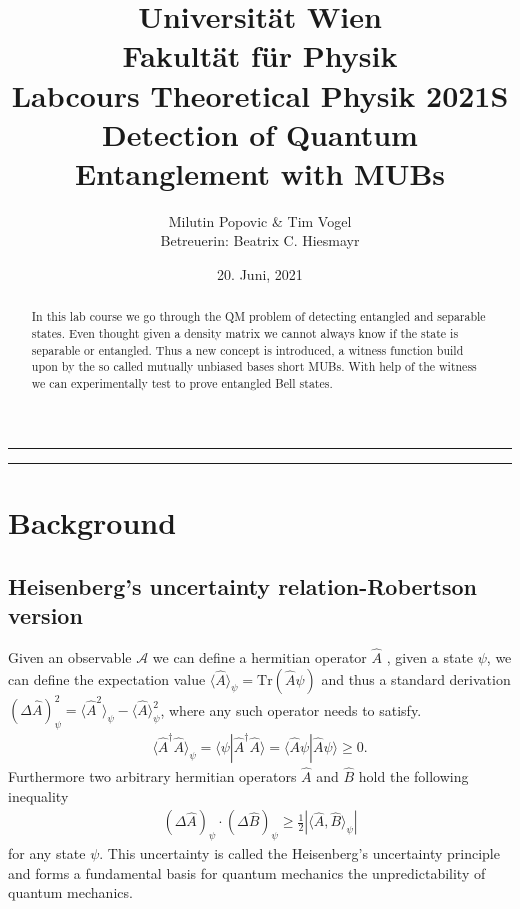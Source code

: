 \documentclass[a4paper]{article}
\title{Universität Wien\\ Fakultät für Physik\\
\vspace{1.25cm}Labcours Theoretical Physik 2021S \\ Detection of Quantum
Entanglement with MUBs
}
\author{Milutin Popovic \& Tim Vogel \vspace{1cm}\\ Betreuerin: Beatrix C. Hiesmayr}
\date{20. Juni, 2021}
\begin{document}
\maketitle

\noindent\rule[0.5ex]{\linewidth}{1pt}
\begin{abstract}
    In this lab course we go through the QM problem of detecting entangled and
    separable states. Even thought given a density matrix we cannot always know if
    the state is separable or entangled. Thus a new concept is introduced, a
    witness function build upon by the so called mutually unbiased bases short
    MUBs. With help of the witness we can experimentally test to prove
    entangled Bell states.
\end{abstract}
\noindent\rule[0.5ex]{\linewidth}{1pt}

\tableofcontents

\section{Background}
\subsection{Heisenberg's uncertainty relation-Robertson version}
Given an observable $\mathcal{A}$ we can define a hermitian operator $\hat{A}$
, given a state $\psi$, we can define the expectation value $\langle \hat{A} \rangle _\psi
= \text{Tr}(\hat{A}\psi)$ and thus a standard derivation $(\Delta
\hat{A})^2_\psi = \langle \hat{A}^2 \rangle_\psi - \langle \hat{A}
\rangle_\psi^2$, where any such operator needs to satisfy.
\begin{align}
    \langle \hat{A}^\dagger \hat{A} \rangle_\psi = \langle
    \psi|\hat{A}^\dagger\hat{A} \rangle = \langle \hat{A}\psi | \hat{A}\psi
        \rangle \geq 0.
\end{align}
Furthermore two arbitrary hermitian operators $\hat{A}$ and $\hat{B}$ hold the
following inequality
\begin{align}
    (\Delta \hat{A})_\psi \cdot (\Delta \hat{B})_\psi \geq \frac{1}{2} |\langle
    \hat{A}, \hat{B}\rangle_\psi|
\end{align}
for any state $\psi$. This uncertainty is called the Heisenberg's uncertainty
principle and forms a fundamental basis for quantum mechanics the
unpredictability of quantum mechanics.
\end{document}
